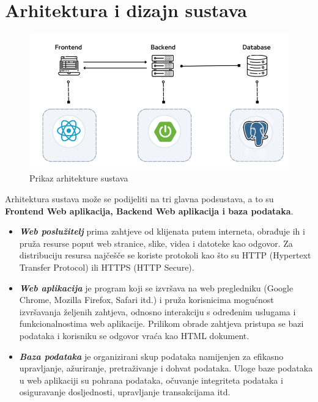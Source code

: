 \chapter{Arhitektura i dizajn sustava}

\begin{figure}[H]
	\includegraphics[scale=1]{slike/prikaz_arhitekture.png}
	\centering
	\caption{Prikaz arhitekture sustava}
\end{figure}

Arhitektura sustava može se podijeliti na tri glavna podsustava, a to su \textbf{Frontend Web aplikacija, Backend Web aplikacija i baza podataka}.
\begin{itemize}
	\item 	\textit{\textbf{Web poslužitelj}} prima zahtjeve od klijenata putem interneta, obrađuje ih i pruža resurse poput web stranice, slike, videa i datoteke kao odgovor. Za distribuciju resursa najčešče se koriste protokoli kao što su HTTP (Hypertext Transfer Protocol) ili HTTPS (HTTP Secure).
	\item 	\textit{\textbf{Web aplikacija}} je program koji se izvršava na web pregledniku (Google Chrome, Mozilla Firefox, Safari itd.) i pruža korisnicima mogućnost izvršavanja željenih zahtjeva, odnosno interakciju s određenim uslugama i funkcionalnostima web aplikacije. Prilikom obrade zahtjeva pristupa se bazi podataka i korisniku se odgovor vraća kao HTML dokument.
	\item 	\textit{\textbf{Baza podataka}} je organizirani skup podataka namijenjen za efikasno upravljanje, ažuriranje, pretraživanje i dohvat podataka. Uloge baze podataka u web aplikaciji su pohrana podataka, očuvanje integriteta podataka i osiguravanje dosljednosti, upravljanje transakcijama itd.
\end{itemize}

